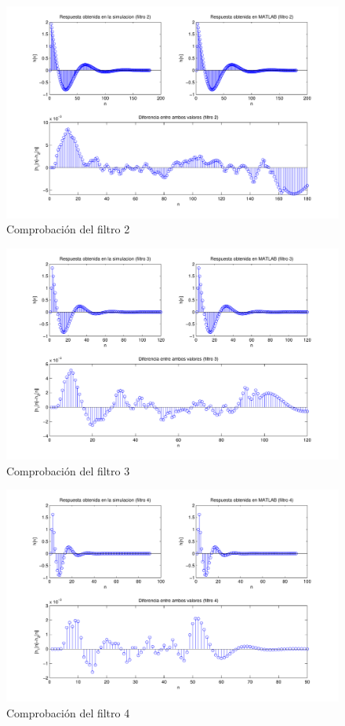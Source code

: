 \documentclass[a4paper,12pt]{article}
\begin{document}
\begin{figure}[hbt]
\includegraphics[width=\textwidth]{img/respfiltro2.pdf} 
\caption{Comprobación del filtro 2} \label{fig:filter2}
\end{figure}

\begin{figure}[hbt]
\includegraphics[width=\textwidth]{img/respfiltro3.pdf} 
\caption{Comprobación del filtro 3} \label{fig:filter3}
\end{figure}

\begin{figure}[hbt]
\includegraphics[width=\textwidth]{img/respfiltro4.pdf} 
\caption{Comprobación del filtro 4} \label{fig:filter4}
\end{figure}
\end{document}
